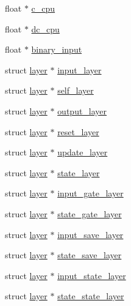 \begin{DoxyCompactItemize}
\item 
float $\ast$ \mbox{\hyperlink{structlayer_ae6b07fa9262cecce9ec149e37c001d81}{c\+\_\+cpu}}
\item 
float $\ast$ \mbox{\hyperlink{structlayer_ac4bc1b441b4be3b7a33d48934d883a92}{dc\+\_\+cpu}}
\item 
float $\ast$ \mbox{\hyperlink{structlayer_a65b3a401a9e02fc7b7260705ade1b317}{binary\+\_\+input}}
\item 
struct \mbox{\hyperlink{structlayer}{layer}} $\ast$ \mbox{\hyperlink{structlayer_afcfa8ab43a850ea490c6d82ff05def87}{input\+\_\+layer}}
\item 
struct \mbox{\hyperlink{structlayer}{layer}} $\ast$ \mbox{\hyperlink{structlayer_a4b265f84aaca806ccaf8607156fbb067}{self\+\_\+layer}}
\item 
struct \mbox{\hyperlink{structlayer}{layer}} $\ast$ \mbox{\hyperlink{structlayer_a93e590cb5d7d1cb0ff4803cd15dd0b51}{output\+\_\+layer}}
\item 
struct \mbox{\hyperlink{structlayer}{layer}} $\ast$ \mbox{\hyperlink{structlayer_a091a5757286a08a99ee76cd332ae8631}{reset\+\_\+layer}}
\item 
struct \mbox{\hyperlink{structlayer}{layer}} $\ast$ \mbox{\hyperlink{structlayer_a777da8634fb7e1e1243c79dbec93304e}{update\+\_\+layer}}
\item 
struct \mbox{\hyperlink{structlayer}{layer}} $\ast$ \mbox{\hyperlink{structlayer_ac79543fef7f4662508f07bc68483a78f}{state\+\_\+layer}}
\item 
struct \mbox{\hyperlink{structlayer}{layer}} $\ast$ \mbox{\hyperlink{structlayer_ad7cd67a8989bbdafa89982d9c1f64c78}{input\+\_\+gate\+\_\+layer}}
\item 
struct \mbox{\hyperlink{structlayer}{layer}} $\ast$ \mbox{\hyperlink{structlayer_a0b1b6cbee3d9421055512d52d8291929}{state\+\_\+gate\+\_\+layer}}
\item 
struct \mbox{\hyperlink{structlayer}{layer}} $\ast$ \mbox{\hyperlink{structlayer_a1dca5c6d106ae9a60fe70b7a9532cfc5}{input\+\_\+save\+\_\+layer}}
\item 
struct \mbox{\hyperlink{structlayer}{layer}} $\ast$ \mbox{\hyperlink{structlayer_a5258c642da20d6011c579edc4d1efe03}{state\+\_\+save\+\_\+layer}}
\item 
struct \mbox{\hyperlink{structlayer}{layer}} $\ast$ \mbox{\hyperlink{structlayer_a1f41820898325961a6acc16b113b90c7}{input\+\_\+state\+\_\+layer}}
\item 
struct \mbox{\hyperlink{structlayer}{layer}} $\ast$ \mbox{\hyperlink{structlayer_a2c2e848a9857ec5f5fd2b6205b2e963f}{state\+\_\+state\+\_\+layer}}

\end{DoxyCompactItemize}
